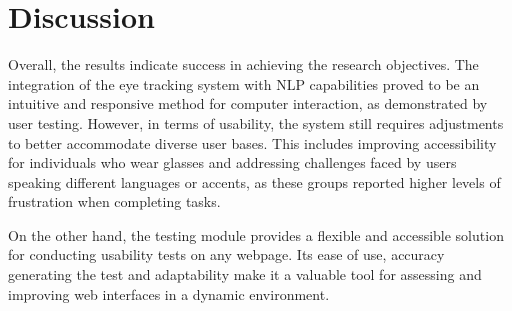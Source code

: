 \section{Discussion}

Overall, the results indicate success in achieving the research objectives. The integration of the eye tracking system with NLP capabilities proved to be an intuitive and responsive method for computer interaction, as demonstrated by user testing. However, in terms of usability, the system still requires adjustments to better accommodate diverse user bases. This includes improving accessibility for individuals who wear glasses and addressing challenges faced by users speaking different languages or accents, as these groups reported higher levels of frustration when completing tasks.

On the other hand, the testing module provides a flexible and accessible solution for conducting usability tests on any webpage. Its ease of use, accuracy generating the test and adaptability make it a valuable tool for assessing and improving web interfaces in a dynamic environment.


